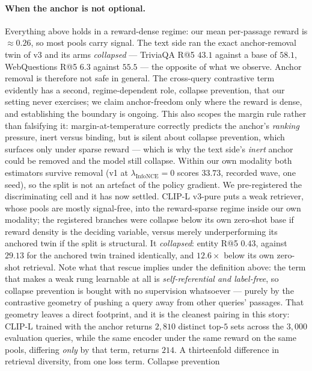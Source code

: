 \paragraph{When the anchor is not optional.} Everything above holds in
a reward-dense regime: our mean per-passage reward is ${\approx}0.26$, so most pools carry signal.
The text side ran the exact anchor-removal twin of v3 and its arms \emph{collapsed} --- TriviaQA
R@5 $43.1$ against a base of $58.1$, WebQuestions R@5 $6.3$ against $55.5$ --- the opposite of
what we observe. Anchor removal is therefore not safe in general. The cross-query contrastive term
evidently has a second, regime-dependent role, collapse prevention, that our setting never
exercises; we claim anchor-freedom only where the reward is dense, and establishing the boundary
is ongoing. This also scopes the margin rule rather than falsifying it: margin-at-temperature
correctly predicts the anchor's \emph{ranking} pressure, inert versus binding, but is silent
about collapse prevention, which surfaces only under sparse reward --- which is why the text
side's \emph{inert} anchor could be removed and the model still collapse. Within our own
modality both estimators survive removal (v1 at $\lambda_{\mathrm{InfoNCE}}{=}0$ scores $33.73$,
recorded wave, one seed), so the split is not an artefact of the policy gradient. We pre-registered
the discriminating cell and it has now settled. \textsc{CLIP-L} v3-pure puts a weak retriever,
whose pools are mostly signal-free, into the reward-sparse regime inside our own modality; the
registered branches were collapse below its own zero-shot base if reward density is the deciding
variable, versus merely underperforming its anchored twin if the split is structural. It
\emph{collapsed}: entity R@5 $0.43$, against $29.13$ for the anchored twin trained identically,
and $12.6\times$ below its own zero-shot retrieval. Note what that rescue implies under the
definition above: the term that makes a weak rung learnable at all is \emph{self-referential and
label-free}, so collapse prevention is bought with no supervision whatsoever --- purely by the
contrastive geometry of pushing a query away from other queries' passages. That geometry leaves a
direct footprint, and it is the cleanest pairing in this story: \textsc{CLIP-L} trained with the
anchor returns $2{,}810$ distinct top-$5$ sets across the $3{,}000$ evaluation queries, while the
same encoder under the same reward on the same pools, differing \emph{only} by that term, returns
$214$. A thirteenfold difference in retrieval diversity, from one loss term. Collapse prevention
